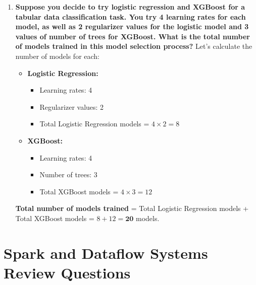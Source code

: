 \documentclass{article}
\begin{document}
\begin{enumerate}
    \item \textbf{Suppose you decide to try logistic regression and XGBoost for a tabular data classification task. You try 4 learning rates for each model, as well as 2 regularizer values for the logistic model and 3 values of number of trees for XGBoost. What is the total number of models trained in this model selection process?}
    Let's calculate the number of models for each:
    \begin{itemize}
        \item \textbf{Logistic Regression:}
            \begin{itemize}
                \item Learning rates: 4
                \item Regularizer values: 2
                \item Total Logistic Regression models = $4 \times 2 = 8$
            \end{itemize}
        \item \textbf{XGBoost:}
            \begin{itemize}
                \item Learning rates: 4
                \item Number of trees: 3
                \item Total XGBoost models = $4 \times 3 = 12$
            \end{itemize}
    \end{itemize}
    \textbf{Total number of models trained} = Total Logistic Regression models + Total XGBoost models = $8 + 12 = \textbf{20}$ models.

\end{enumerate}

\section*{Spark and Dataflow Systems Review Questions}
\end{document}
